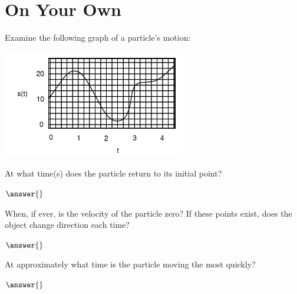 \documentclass{ximera}
\begin{document}
\section{On Your Own}
\begin{question}
Examine the following graph of a particle's motion:

\begin{image}
    \includegraphics[width=80mm]{position.png}
\end{image}

At what time(s) does the particle return to its initial point?

$\answer{}$

When, if ever, is the velocity of the particle zero? If these points exist, does the object change direction each time?

$\answer{}$

At approximately what time is the particle moving the most quickly?

$\answer{}$
\end{question}
\end{document}
